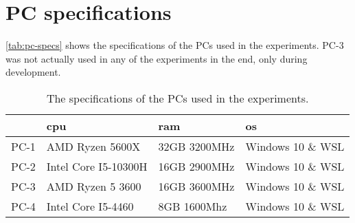 \chapter{PC specifications}\label{cha:pc-specs}
\autoref{tab:pc-specs} shows the specifications of the PCs used in the experiments. PC-3 was not actually used in any of the experiments in the end, only during development.

\begin{table}[htb!]
    \centering
    \begin{tabular}{llll}
        \toprule
             & \gls{cpu}            & \acs{ram}    & \acs{os}          \\
        \midrule
        PC-1 & AMD Ryzen 5600X      & 32GB 3200MHz & Windows 10 \& WSL \\
        PC-2 & Intel Core I5-10300H & 16GB 2900MHz & Windows 10 \& WSL \\
        PC-3 & AMD Ryzen 5 3600     & 16GB 3600MHz & Windows 10 \& WSL \\
        PC-4 & Intel Core I5-4460   & 8GB 1600Mhz  & Windows 10 \& WSL \\
        \bottomrule
    \end{tabular}
    \caption{The specifications of the PCs used in the experiments.}
    \label{tab:pc-specs}
\end{table}